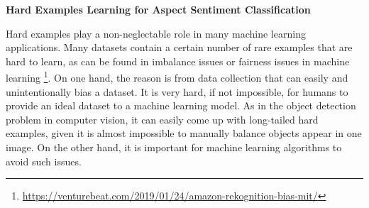 \textbf{Hard Examples Learning for Aspect Sentiment Classification}

Hard examples play a non-neglectable role in many machine learning applications.
Many datasets contain a certain number of rare examples that are hard to learn, as can be found in imbalance issues or fairness issues in machine learning \footnote{\url{https://venturebeat.com/2019/01/24/amazon-rekognition-bias-mit/}}.
On one hand, the reason is from data collection that can easily and unintentionally bias a dataset.
It is very hard, if not impossible, for humans to provide an ideal dataset to a machine learning model.
As in the object detection problem \cite{shrivastava2016training,lin2017focal} in computer vision, it can easily come up with long-tailed hard examples, given it is almost impossible to manually balance objects appear in one image.
On the other hand, it is important for machine learning algorithms to avoid such issues. 

